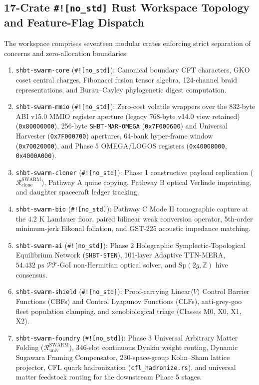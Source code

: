 \documentclass[11pt,onecolumn]{article}
\begin{document}
\subsection{17-Crate \texttt{\#![no\_std]} Rust Workspace Topology and Feature-Flag Dispatch}
The workspace comprises seventeen modular crates enforcing strict separation of concerns and zero-allocation boundaries:
\begin{enumerate}
    \item \texttt{shbt-swarm-core} (\texttt{\#![no\_std]}): Canonical boundary CFT characters, GKO coset central charges, Fibonacci fusion tensor algebra, 124-channel braid representations, and Burau--Cayley phylogenetic digest computation.
    \item \texttt{shbt-swarm-mmio} (\texttt{\#![no\_std]}): Zero-cost volatile wrappers over the 832-byte ABI v15.0 MMIO register aperture (legacy 768-byte v14.0 view retained) (\texttt{0x80000000}), 256-byte \texttt{SHBT-MAR-OMEGA} (\texttt{0x7F000600}) and Universal Harvester (\texttt{0x7F000700}) apertures, 64-bank hyper-frame window (\texttt{0x70020000}), and Phase 5 OMEGA/LOGOS registers (\texttt{0x40008000}, \texttt{0x4000A000}).
    \item \texttt{shbt-swarm-cloner} (\texttt{\#![no\_std]}): Phase 1 constructive payload replication ($\mathcal{R}_{\text{clone}}^{\text{SWARM}}$), Pathway A quine copying, Pathway B optical Verlinde imprinting, and daughter spacecraft ledger tracking.
    \item \texttt{shbt-swarm-bio} (\texttt{\#![no\_std]}): Pathway C Mode II tomographic capture at the $4.2\text{ K}$ Landauer floor, paired bilinear weak conversion operator, 5th-order minimum-jerk Eikonal foliation, and GST-225 acoustic impedance matching.
    \item \texttt{shbt-swarm-ai} (\texttt{\#![no\_std]}): Phase 2 Holographic Symplectic-Topological Equilibrium Network (\texttt{SHBT-STEN}), 101-layer Adaptive TTN-MERA, $54.432\text{ ps}$ $\mathcal{PT}$-GoI non-Hermitian optical solver, and $\text{Sp}(2g, \mathbb{Z})$ hive consensus.
    \item \texttt{shbt-swarm-shield} (\texttt{\#![no\_std]}): Proof-carrying $\text{Linear}\langle V\rangle$ Control Barrier Functions (CBFs) and Control Lyapunov Functions (CLFs), anti-grey-goo fleet population clamping, and xenobiological triage (Classes M0, X0, X1, X2).
    \item \texttt{shbt-swarm-foundry} (\texttt{\#![no\_std]}): Phase 3 Universal Arbitrary Matter Folding ($\mathcal{R}_{\text{univ}}^{\text{SWARM}}$), 346-slot continuous Dynkin weight routing, Dynamic Sugawara Framing Compensator, 230-space-group Kohn--Sham lattice projector, CFL quark hadronization (\texttt{cfl\_hadronize.rs}), and universal matter feedstock routing for the downstream Phase 5 stages.

\end{enumerate}
\end{document}
